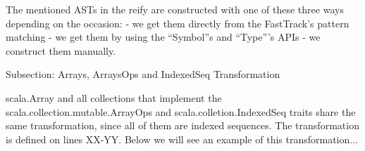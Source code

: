 The mentioned ASTs in the reify are constructed with one of these three ways
depending on the occasion:
- we get them directly from the FastTrack's pattern matching
- we get them by using the ``Symbol''s and ``Type'''s APIs
- we construct them manually.


Subsection: Arrays, ArraysOps and IndexedSeq Transformation

scala.Array and all collections that implement the 
scala.collection.mutable.ArrayOps and scala.colletion.IndexedSeq traits share
the same transformation, since all of them are indexed sequences. The
transformation is defined on lines XX-YY. Below we will see an example of this
transformation...

